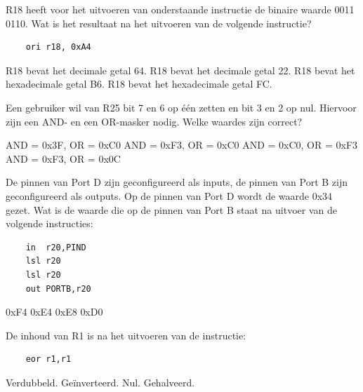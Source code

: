 \documentclass[a4paper,12pt,fleqn,dutch]{tisdexam}
\begin{document}
\renewcommand{\arraystretch}{1.1}


\begin{questions}


\question
\label{opg:opg1}
R18 heeft voor het uitvoeren van onderstaande instructie de binaire waarde 0011 0110.
Wat is het resultaat na het uitvoeren van de volgende instructie?
\begin{verbatim}
    ori r18, 0xA4
\end{verbatim}
\begin{choices}
	\choice R18 bevat het decimale getal 64.
	\choice R18 bevat het decimale getal 22.
	\CorrectChoice \label{ans:opg1} R18 bevat het hexadecimale getal B6.
	\choice R18 bevat het hexadecimale getal FC.
\end{choices}


\question
\label{opg:opg2}
Een gebruiker wil van R25 bit 7 en 6 op \'{e}\'{e}n zetten en bit 3 en 2 op nul. Hiervoor zijn een
AND- en een OR-masker nodig. Welke waardes zijn correct?
\begin{choices}
	\choice AND = 0x3F, OR = 0xC0
	\CorrectChoice \label{ans:opg2} AND = 0xF3, OR = 0xC0
	\choice AND = 0xC0, OR = 0xF3
	\choice AND = 0xF3, OR = 0x0C
\end{choices}


\question
\label{opg:opg3}
De pinnen van Port D zijn geconfigureerd als inputs, de pinnen van Port B zijn geconfigureerd als
outputs. Op de pinnen van Port D wordt de waarde 0x34 gezet.
Wat is de waarde die op de pinnen van Port B staat na uitvoer van de volgende instructies:
\begin{verbatim}
    in  r20,PIND
    lsl r20
    lsl r20
    out PORTB,r20
\end{verbatim}
\begin{choices}
	\choice 0xF4
	\choice 0xE4
	\choice 0xE8
	\CorrectChoice \label{ans:opg3} 0xD0
\end{choices}


\question
\label{opg:opg4}
De inhoud van R1 is na het uitvoeren van de instructie:
\begin{verbatim}
    eor r1,r1
\end{verbatim}
\begin{choices}
	\choice Verdubbeld.
	\choice Ge\"{i}nverteerd.
	\CorrectChoice \label{ans:opg4} Nul.
	\choice Gehalveerd.
\end{choices}



\end{questions}
\end{document}
